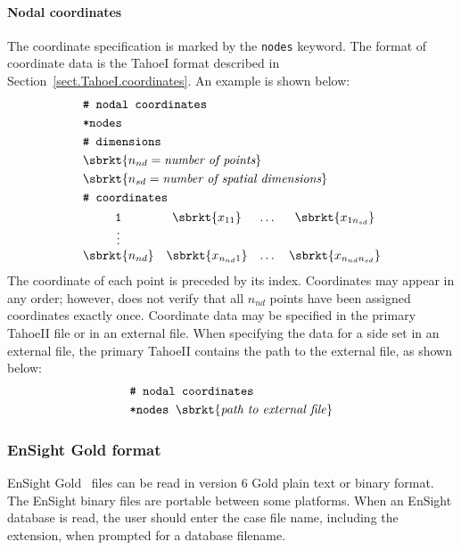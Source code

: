 \paragraph{Nodal coordinates}
The coordinate specification is marked by the \texttt{nodes} keyword.
The format of coordinate data is the TahoeI format described in 
Section~\ref{sect.TahoeI.coordinates}.
An example is shown below:
\begin{align}
& \texttt{\# nodal coordinates} \notag \\
& \texttt{*nodes} \notag \\
& \texttt{\# dimensions} \notag \\
& \sbrkt{n_{nd} = \textit{number of points}} \notag \\
& \sbrkt{n_{sd} = \textit{number of spatial dimensions}} \notag \\
& \texttt{\# coordinates} \notag \\
& \begin{matrix}
\texttt{1} & \sbrkt{x_{11}} & \dots  & \sbrkt{x_{1n_{sd}}} \\
\vdots \\
\sbrkt{n_{nd}}  & \sbrkt{x_{n_{nd}1}} & \dots & \sbrkt{x_{n_{nd}n_{sd}}}
\end{matrix} \notag
\end{align}
The coordinate of each point is preceded by its index. Coordinates 
may appear in any order; however, \tahoe does not verify that all 
$n_{nd}$ points have been assigned coordinates exactly once.
Coordinate data may be specified in the primary TahoeII file or in an 
external file.
When specifying the data for a side set in an external file, the 
primary TahoeII contains the path to the external file, as shown below:
\begin{align}
& \texttt{\# nodal coordinates} \notag \\
& \texttt{*nodes~} \sbrkt{\textrm{\textit{path to external file}}}
\end{align}

\subsubsection{\textsf{EnSight Gold} format}
\label{sect.file.ensight}
\textsf{EnSight Gold}~\cite{EnSight6} files can be read in version 6 Gold 
plain text or binary format. The EnSight binary files are portable between 
some platforms. When an EnSight database is read, the user should enter the 
case file name, including the extension, when prompted for a database 
filename. 

